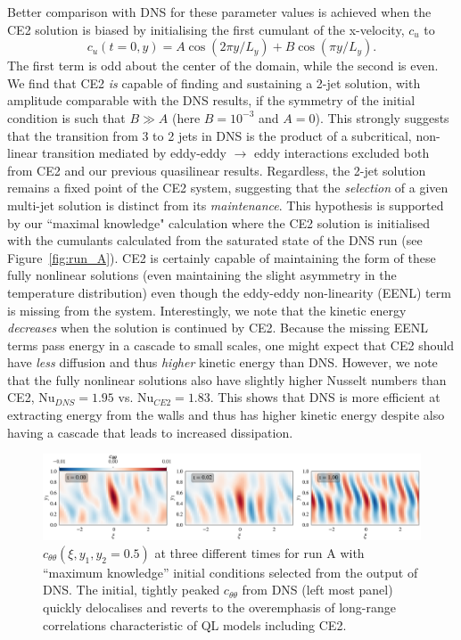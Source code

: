 \documentclass{jfm}
\newcommand{\cu}{c_u}
\newcommand{\ctt}{c_{\theta \theta}}
\begin{document}
Better comparison with DNS for these parameter values is achieved when the CE2 solution is biased 
 by initialising the first cumulant of the x-velocity, $\cu$ to
\begin{equation}
  \label{eq:bias}
  \cu(t=0, y) = A \cos(2\pi y/L_y) + B \cos (\pi y/L_y).
\end{equation}
The first term is odd about the center of the domain, while the second is even.
We find that CE2 \emph{is} capable of finding and sustaining a 2-jet solution, with amplitude comparable with the DNS results, if the symmetry of the initial condition is such that $B \gg A$ (here $B = 10^{-3}$ and $A = 0$).
This strongly suggests that the transition from 3 to 2 jets in DNS is the product of a subcritical, non-linear transition mediated by eddy-eddy $\to$ eddy interactions excluded both from CE2 and our previous quasilinear results.
Regardless, the 2-jet solution remains a fixed point of the CE2 system, suggesting that the \emph{selection} of a given multi-jet solution is distinct from its \emph{maintenance}.
This hypothesis is supported by our ``maximal knowledge" calculation where the CE2 solution is initialised with the cumulants calculated from the saturated state of the DNS run (see Figure~\ref{fig:run_A}). CE2 is certainly capable of maintaining the form of these fully nonlinear solutions (even maintaining the slight asymmetry in the temperature distribution) even though the eddy-eddy non-linearity (EENL) term is missing from the system.
Interestingly, we note that the kinetic energy \emph{decreases} when the solution is continued by CE2. Because the missing EENL terms pass energy in a cascade to small scales, one might expect that CE2 should have \emph{less} diffusion and thus \emph{higher} kinetic energy than DNS.
However, we note that the fully nonlinear solutions also have slightly higher Nusselt numbers than CE2, $\mathrm{Nu}_{DNS} = 1.95$ vs. $\mathrm{Nu}_{CE2} = 1.83$. This shows that DNS is more efficient at extracting energy from the walls and thus has higher kinetic energy despite also having a cascade that leads to increased dissipation.
\begin{figure}
    \centering
    \includegraphics[width=\textwidth]{fig2.eps}
    \caption{$\ctt(\xi, y_1, y_2 = 0.5)$ at three different times for run A with ``maximum knowledge'' initial conditions selected from the output of DNS. The initial, tightly peaked $\ctt$ from DNS (left most panel) quickly delocalises and reverts to the overemphasis of long-range correlations characteristic of QL models including CE2.}
    \label{fig:run_A_decoherence}
\end{figure}
\end{document}
